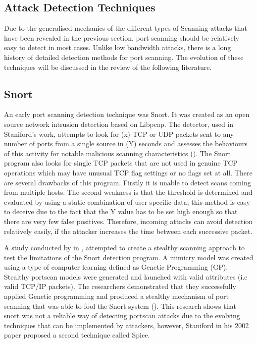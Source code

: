 \subsection{Attack Detection Techniques}

Due to the generalised mechanics of the different types of Scanning attacks that have been revealed in the previous section, port scanning should be relatively easy to detect in most cases. Unlike low bandwidth attacks, there is a long history of detailed detection methods for port scanning. The evolution of these techniques will be discussed in the review of the following literature.

\subsection{Snort}

An early port scanning detection technique was Snort. It was created as an open source network intrusion detection based on Libpcap. The detector, used in Staniford's work, attempts to look for (x) TCP or UDP packets sent to any number of ports from a single source in (Y) seconds and assesses the behaviours of this activity for notable malicious scanning characteristics (\cite{staniford2002practical}). The Snort program also looks for single TCP packets that are not used in genuine TCP operations which may have unusual TCP flag settings or no flags set at all. There are several drawbacks of this program. Firstly it is unable to detect scans coming from multiple hosts. The second weakness is that the threshold is determined  and evaluated by using a static combination of user specific data; this method is easy to deceive due to the fact that the Y value has to be set high enough so that there are very few false positives. Therefore, incoming attacks can avoid detection relatively easily, if the attacker increases the time between each successive packet.

A study conducted by \citeauthor{laroche2009evolving} in \citeyear{laroche2009evolving}, attempted to create a stealthy scanning approach to test the limitations of the Snort detection program. A mimicry model was created using a type of computer learning defined as Genetic Programming (GP). Stealthy portscan models were generated and launched with valid attributes (i.e valid TCP/IP packets). The researchers demonstrated that they successfully applied Genetic programming and produced a stealthy mechanism of port scanning that was able to fool the Snort system (\cite{laroche2009evolving}). This research shows that snort was not a reliable way of detecting portscan attacks due to the evolving techniques that can be implemented by attackers, however, Staniford in his 2002 paper proposed a second technique called Spice.
 
